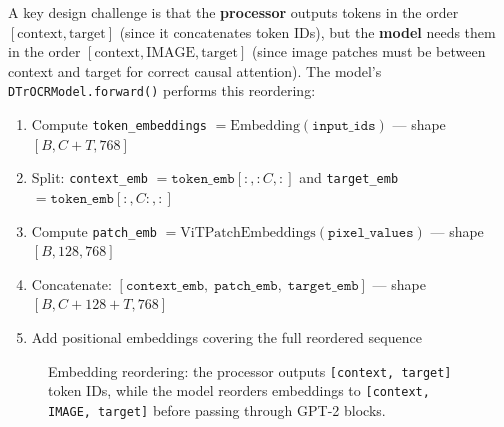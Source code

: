 \documentclass[11pt, a4paper]{report}
\begin{document}
A key design challenge is that the \textbf{processor} outputs tokens in the order $[\text{context}, \text{target}]$ (since it concatenates token IDs), but the \textbf{model} needs them in the order $[\text{context}, \text{IMAGE}, \text{target}]$ (since image patches must be between context and target for correct causal attention). The model's \texttt{DTrOCRModel.forward()} performs this reordering:

\begin{enumerate}[leftmargin=2em]
  \item Compute \texttt{token\_embeddings} $= \mathrm{Embedding}(\texttt{input\_ids})$ --- shape $[B, C{+}T, 768]$
  \item Split: \texttt{context\_emb} $= \texttt{token\_emb}[:, :C, :]$ and \texttt{target\_emb} $= \texttt{token\_emb}[:, C:, :]$
  \item Compute \texttt{patch\_emb} $= \mathrm{ViTPatchEmbeddings}(\texttt{pixel\_values})$ --- shape $[B, 128, 768]$
  \item Concatenate: $[\texttt{context\_emb},\; \texttt{patch\_emb},\; \texttt{target\_emb}]$ --- shape $[B, C{+}128{+}T, 768]$
  \item Add positional embeddings covering the full reordered sequence
\end{enumerate}

\begin{figure}[t]
\centering
{}
\caption{Embedding reordering: the processor outputs \texttt{[context, target]} token IDs, while the model reorders embeddings to \texttt{[context, IMAGE, target]} before passing through GPT-2 blocks.}
\label{fig:embedding-reorder}
\end{figure}
\end{document}
